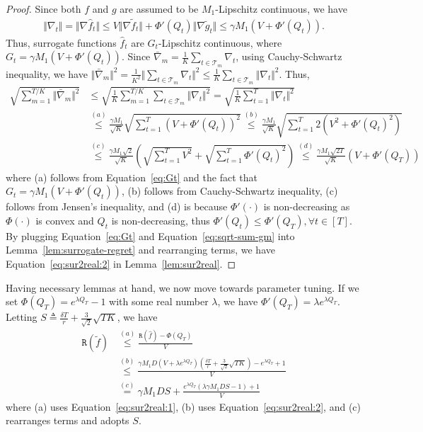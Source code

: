 \documentclass[twoside,11pt,]{article}
\newcommand{\C}[1]{\mathcal{#1}}
\newcommand{\tf}{\tilde{f}}
\newcommand{\tft}{\tilde{f}_t}
\newcommand{\tgt}{\tilde{g}_t}
\newcommand{\hf}{\hat{f}}
\newcommand{\hft}{\hat{f}_t}
\newcommand{\normdt}{\Vert \nabla_t \Vert}
\newcommand{\qt}{Q_t}
\newcommand{\bn}{\bar{\nabla}}
\begin{document}
\begin{proof}
    Since both $f$ and $g$ are assumed to be $M_1$-Lipschitz continuous, we have 
    \begin{align}
    \label{eq:Gt}
         \normdt = \Vert \nabla \hft \Vert 
    \leq V \Vert \nabla \tft \Vert + \Phi'(\qt) \Vert \nabla \tgt \Vert 
    \leq \gamma M_1(V+\Phi'(\qt)).
    \end{align}
    Thus, surrogate functions $\hft$ are $G_t$-Lipschitz continuous, where $G_t = \gamma M_1(V+\Phi'(\qt))$.
    Since $\bn_m=\frac{1}{K} \sum_{t\in\C{T}_m} \nabla_t$, using Cauchy-Schwartz inequality, we have $\Vert \bn_m \Vert ^2 = \frac{1}{K^2} \Vert \sum_{t\in\C{T}_m} \nabla_t \Vert ^2 \leq \frac{1}{K} \sum_{t\in\C{T}_m}\normdt^2 $. Thus,
    \begin{align}
        \label{eq:sqrt-sum-gm}
        \sqrt{\sum_{m=1}^{T/K} \Vert \bn_m \Vert ^2} 
        &\leq \sqrt{\frac{1}{K} \sum_{m=1}^{T/K} \sum_{t\in\C{T}_m}\normdt^2}
        = \sqrt{ \frac{1}{K} \sum_{t=1}^{T} \normdt^2 } \nonumber \\
        &\overset{(a)}\leq \frac{\gamma M_1}{\sqrt{K}}\sqrt{ \sum_{t=1}^{T} (V+\Phi'(\qt))^2 }
        \overset{(b)}\leq \frac{\gamma M_1}{\sqrt{K}}\sqrt{ \sum_{t=1}^{T} 2(V^2+\Phi'(\qt)^2) } \nonumber \\
        &\overset{(c)}\leq \frac{\gamma M_1 \sqrt{2}}{\sqrt{K}} (\sqrt{\sum_{t=1}^{T}V^2}+\sqrt{\sum_{t=1}^{T}\Phi'(\qt)^2})
        \overset{(d)}\leq \frac{\gamma M_1 \sqrt{2T}}{\sqrt{K}} (V + \Phi'(Q_T))
    \end{align}
    where (a) follows from Equation~\eqref{eq:Gt} and the fact that $G_t=\gamma M_1(V+\Phi'(\qt))$, (b) follows from Cauchy-Schwartz inequality, (c) follows from Jensen's inequality, and (d) is because $\Phi'(\cdot)$ is non-decreasing as $\Phi(\cdot)$ is convex and $Q_t$ is non-decreasing, thus $\Phi'(Q_t) \leq \Phi'(Q_T), \forall t\in[T]$.
    By plugging Equation~\eqref{eq:Gt} and Equation~\eqref{eq:sqrt-sum-gm} into Lemma~\ref{lem:surrogate-regret} and rearranging terms, we have Equation~\eqref{eq:sur2real:2} in Lemma~\ref{lem:sur2real}.
\end{proof}

Having necessary lemmas at hand, we now move towards parameter tuning.
If we set $\Phi(Q_T)=e^{\lambda Q_T}-1$ with some real number $\lambda$, we have $\Phi'(Q_T)=\lambda e^{\lambda Q_T}$. Letting $S \triangleq \frac{\delta T}{r} + \frac{3}{\sqrt{2}}\sqrt{TK}$, we have 
\begin{align}
\label{eq:regretTft}
    \mathtt{R}(\tf) & \overset{(a)}{\leq} \frac{\mathtt{R} (\hf)-\Phi (Q_T)}{V} \nonumber\\
    & \overset{(b)}{\leq}
    \frac{\gamma M_1 D (V+\lambda e^{\lambda Q_T})(\frac{\delta T}{r} + \frac{3}{\sqrt{2}}\sqrt{TK})-e^{\lambda Q_T}+1}{V}\nonumber\\
    &\overset{(c)} = \gamma M_1 D S 
    + \frac{e^{\lambda Q_T} \left( \lambda \gamma M_1 D S-1 \right)+1}{V}
\end{align}
where (a) uses Equation~\eqref{eq:sur2real:1}, (b) uses Equation~\eqref{eq:sur2real:2}, and (c) rearranges terms and adopts $S$.
\end{document}
